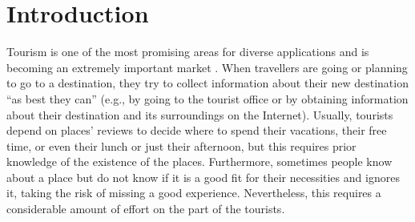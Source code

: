 \section{Introduction}



Tourism is one of the most promising areas for diverse applications and is becoming an extremely
important market \cite{buhalis2011tourism,murphy2013tourism,fermoso2015open,ku2015cultivating,alghamdi2016tourism,artemenko2017tourism,kazandzhieva2019tourism}. 
When travellers are going or planning to go to a destination, they try to collect information about their new destination “as best they can” (e.g., by going to the tourist office or by obtaining information about their destination and its surroundings on the Internet). Usually, tourists depend on places' reviews to decide where to spend their vacations, their free time, or even their lunch or just their afternoon, but this requires prior knowledge of the existence of the places. Furthermore, sometimes people know about a place but do not know if it is a good fit for their necessities and ignores it, taking the risk of missing a good experience. Nevertheless, this requires a considerable amount of effort on the part of the tourists.




